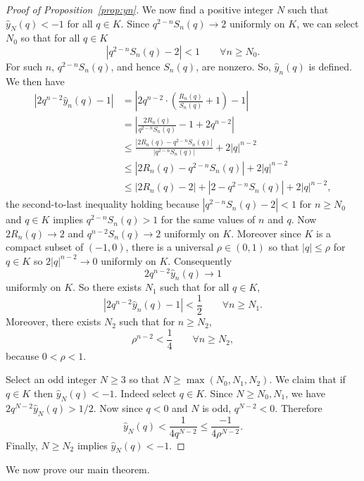 \documentclass[12pt]{amsart}
\theoremstyle{definition}
\begin{document}
\begin{proof}[Proof of Proposition~\ref{prop:yn}]
We now find a positive integer $N$ such that $\hat{y}_N(q)<-1$ for all $q \in K$. Since $q^{2-n}S_n(q) \to 2$ uniformly on $K$, we can select $N_0$ so that for all $q \in K$
\[
|q^{2-n}S_n(q)-2|<1 \qquad \forall n \geq N_0.
\]
For such $n$, $q^{2-n}S_n(q)$, and hence $S_n(q)$, are nonzero. So, $\hat{y}_n(q)$ is defined. We then have
\begin{align*}
|2q^{n-2}\hat{y}_n(q)-1| &=\left|2q^{n-2} \cdot \left(\frac{R_n(q)}{S_n(q)}+1\right)-1\right|\\
&= \left| \frac{2R_n(q)}{q^{2-n}S_n(q)} - 1 + 2q^{n-2} \right| \\
&\leq \frac{|2R_n(q)-q^{2-n}S_n(q)|}{|q^{2-n}S_n(q)|} + 2|q|^{n-2} \\
&\leq |2R_n(q)-q^{2-n}S_n(q)|+2|q|^{n-2} \\
&\leq |2R_n(q)-2|+|2-q^{2-n}S_n(q)|+2|q|^{n-2},
\end{align*}
the second-to-last inequality holding because $|q^{2-n}S_n(q)-2|<1$ for $n \geq N_0$ and $q \in K$ implies $q^{2-n}S_n(q)>1$ for the same values of $n$ and $q$. Now $2R_n(q) \to 2$ and $q^{n-2}S_n(q) \to 2$ uniformly on $K$. Moreover since $K$ is a compact subset of $(-1,0)$, there is a universal $\rho \in (0,1)$ so that $|q|\leq \rho$ for $q \in K$ so $2|q|^{n-2} \to 0$ uniformly on $K$. Consequently
\[
2q^{n-2}\hat{y}_n(q) \to 1
\]
uniformly on $K$. So there exists $N_1$ such that for all $q \in K$,
\[
|2q^{n-2}\hat{y}_n(q)-1|<\frac{1}{2} \qquad \forall n \geq N_1.
\]
Moreover, there exists $N_2$ such that for $n \geq N_2$, 
\[
\rho^{n-2}<\frac{1}{4} \qquad \forall n \geq N_2,
\]
because $0<\rho<1$. 

Select an odd integer $N \geq 3$ so that $N \geq \max(N_0,N_1,N_2)$. We claim that if $q \in K$ then $\hat{y}_N(q)<-1$. Indeed select $q \in K$. Since $N \geq N_0,N_1$, we have $2q^{N-2}\hat{y}_N(q)>1/2$. Now since $q<0$ and $N$ is odd, $q^{N-2}<0$. Therefore
\[
\hat{y}_N(q)<\frac{1}{4q^{N-2}} \leq \frac{-1}{4\rho^{N-2}}.
\]
Finally, $N \geq N_2$ implies $\hat{y}_N(q)<-1$. 
\end{proof}

We now prove our main theorem.
\end{document}
